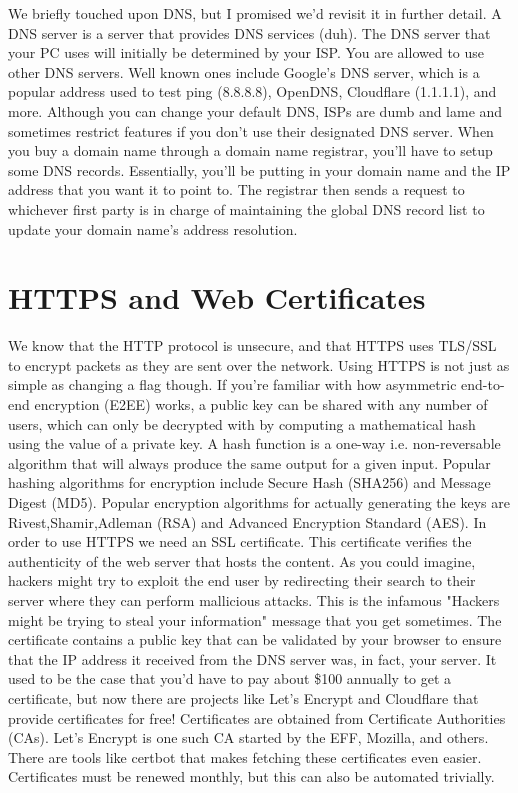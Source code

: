 \documentclass{article}
\begin{document}
We briefly touched upon DNS, but I promised we'd revisit it in further detail. A DNS server is a server that 
provides DNS services (duh). The DNS server that your PC uses will initially be determined by your ISP. You are 
allowed to use other DNS servers. Well known ones include Google's DNS server, which is a popular address used 
to test ping (8.8.8.8), OpenDNS, Cloudflare (1.1.1.1), and more. Although you can change your default DNS, ISPs 
are dumb and lame and sometimes restrict features if you don't use their designated DNS server. When you buy a 
domain name through a domain name registrar, you'll have to setup some DNS records. Essentially, you'll be 
putting in your domain name and the IP address that you want it to point to. The registrar then sends a request 
to whichever first party is in charge of maintaining the global DNS record list to update your domain name's 
address resolution. 

\section{HTTPS and Web Certificates}

We know that the HTTP protocol is unsecure, and that HTTPS uses TLS/SSL to encrypt packets as they are sent over 
the network. Using HTTPS is not just as simple as changing a flag though. If you're familiar with how 
asymmetric end-to-end encryption (E2EE) works, a public key can be shared with any number of users, which can 
only be decrypted with by computing a mathematical hash using the value of a private key. A hash function is a 
one-way i.e. non-reversable algorithm that will always produce the same output for a given input. Popular 
hashing algorithms for encryption include Secure Hash (SHA256) and Message Digest (MD5). Popular encryption 
algorithms for actually generating the keys are Rivest,Shamir,Adleman (RSA) and Advanced Encryption Standard 
(AES). In order to use HTTPS we need an SSL certificate. This certificate verifies the authenticity of the web 
server that hosts the content. As you could imagine, hackers might try to exploit the end user by redirecting 
their search to their server where they can perform mallicious attacks. This is the infamous "Hackers might be 
trying to steal your information" message that you get sometimes. The certificate contains a public key that 
can be validated by your browser to ensure that the IP address it received from the DNS server was, in fact, 
your server. It used to be the case that you'd have to pay about \$100 annually to get a certificate, but now 
there are projects like Let's Encrypt and Cloudflare that provide certificates for free! Certificates are 
obtained from Certificate Authorities (CAs). Let's Encrypt is one such CA started by the EFF, Mozilla, and 
others. There are tools like certbot that makes fetching these certificates even easier. Certificates must be 
renewed monthly, but this can also be automated trivially. 
\end{document}
